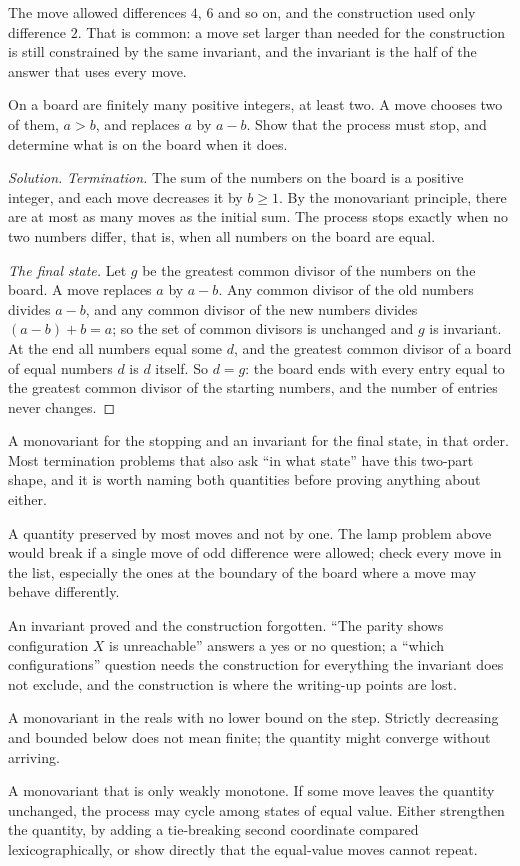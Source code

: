 The move allowed differences $4$, $6$ and so on, and the construction used only difference $2$. That is common: a move set larger than needed for the construction is still constrained by the same invariant, and the invariant is the half of the answer that uses every move.

\begin{example}
On a board are finitely many positive integers, at least two. A move chooses two of them, $a > b$, and replaces $a$ by $a - b$. Show that the process must stop, and determine what is on the board when it does.
\end{example}

\begin{proof}[Solution]
\emph{Termination.} The sum of the numbers on the board is a positive integer, and each move decreases it by $b \ge 1$. By the monovariant principle, there are at most as many moves as the initial sum. The process stops exactly when no two numbers differ, that is, when all numbers on the board are equal.

\emph{The final state.} Let $g$ be the greatest common divisor of the numbers on the board. A move replaces $a$ by $a - b$. Any common divisor of the old numbers divides $a - b$, and any common divisor of the new numbers divides $(a - b) + b = a$; so the set of common divisors is unchanged and $g$ is invariant. At the end all numbers equal some $d$, and the greatest common divisor of a board of equal numbers $d$ is $d$ itself. So $d = g$: the board ends with every entry equal to the greatest common divisor of the starting numbers, and the number of entries never changes.
\end{proof}

A monovariant for the stopping and an invariant for the final state, in that order. Most termination problems that also ask ``in what state'' have this two-part shape, and it is worth naming both quantities before proving anything about either.

\begin{trap}
A quantity preserved by most moves and not by one. The lamp problem above would break if a single move of odd difference were allowed; check every move in the list, especially the ones at the boundary of the board where a move may behave differently.

An invariant proved and the construction forgotten. ``The parity shows configuration $X$ is unreachable'' answers a yes or no question; a ``which configurations'' question needs the construction for everything the invariant does not exclude, and the construction is where the writing-up points are lost.

A monovariant in the reals with no lower bound on the step. Strictly decreasing and bounded below does not mean finite; the quantity might converge without arriving.

A monovariant that is only weakly monotone. If some move leaves the quantity unchanged, the process may cycle among states of equal value. Either strengthen the quantity, by adding a tie-breaking second coordinate compared lexicographically, or show directly that the equal-value moves cannot repeat.
\end{trap}

